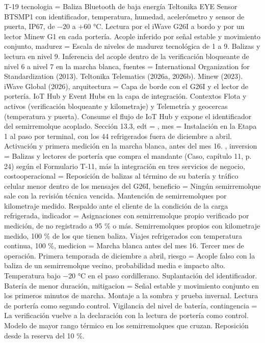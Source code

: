 \begin{formulario}{T-19}
{  tecnologia = {Baliza Bluetooth de baja energía Teltonika EYE Sensor BTSMP1 con identificador, temperatura, humedad, acelerómetro y sensor de puerta, IP67, de $-20$ a $+60$ °C. Lectura por el iWave G26I a bordo y por un lector Minew G1 en cada portería. Acople inferido por señal estable y movimiento conjunto},
  madurez = {Escala de niveles de madurez tecnológica de 1 a 9. Balizas y lectura en nivel 9. Inferencia del acople dentro de la verificación bloqueante de nivel 6 a nivel 7 en la marcha blanca},
  fuentes = {International Organization for Standardization (2013). Teltonika Telematics (2026a, 2026b). Minew (2023). iWave Global (2026)},
  arquitectura = {Capa de borde con el G26I y el lector de portería. IoT Hub y Event Hubs en la capa de integración. Contextos Flota y activos (verificación bloqueante y kilometraje) y Telemetría y geocercas (temperatura y puerta). Consume el flujo de IoT Hub y expone el identificador del semirremolque acoplado. Sección 13.3},
  edt = {},
  mes = {Instalación en la Etapa 1 al paso por terminal, con los 44 refrigerados fuera de diciembre a abril. Activación y primera medición en la marcha blanca, antes del mes 16. },
  inversion = {Balizas y lectores de portería que compra el mandante (Caso, capítulo 11, p. 24) según el Formulario T-11, más la integración en tres servicios de negocio},
  costooperacional = {Reposición de balizas al término de su batería y tráfico celular menor dentro de los mensajes del G26I},
  beneficio = {Ningún semirremolque sale con la revisión técnica vencida. Mantención de semirremolques por kilometraje medido. Respaldo ante el cliente de la condición de la carga refrigerada},
  indicador = {Asignaciones con semirremolque propio verificado por medición, de no registrado a 95 \% o más. Semirremolques propios con kilometraje medido, 100 \% de los que tienen baliza. Viajes refrigerados con temperatura continua, 100 \%},
  medicion = {Marcha blanca antes del mes 16. Tercer mes de operación. Primera temporada de diciembre a abril},
  riesgo = {Acople falso con la baliza de un semirremolque vecino, probabilidad media e impacto alto. Temperatura bajo $-20$ °C en el paso cordillerano. Suplantación del identificador. Batería de menor duración},
  mitigacion = {Señal estable y movimiento conjunto en los primeros minutos de marcha. Montaje a la sombra y prueba invernal. Lectura de portería como segundo control. Vigilancia del nivel de batería},
  contingencia = {La verificación vuelve a la declaración con la lectura de portería como control. Modelo de mayor rango térmico en los semirremolques que cruzan. Reposición desde la reserva del 10 \%. }
}
\end{formulario}
